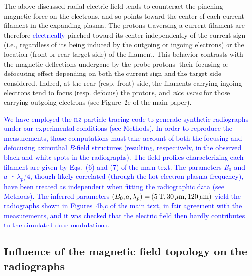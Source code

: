 \documentclass[aps,superscriptaddress]{revtex4}
\begin{document}
The above-discussed radial electric field tends to counteract the pinching magnetic force on the electrons, and so points toward the center of each current filament in the expanding plasma. The protons traversing a current filament are therefore \textcolor{blue}{electrically} pinched toward its center independently of the current sign (i.e., regardless of its being induced by the outgoing or ingoing electrons) or the location (front or rear target side) of the filament. This behavior contrasts with the magnetic deflections undergone by the probe protons, their focusing or defocusing effect depending on both the current sign and the target side considered. Indeed, at the rear (resp. front) side, the filaments carrying ingoing electrons tend to focus (resp. defocus) the protons, and \emph{vice versa} for those carrying outgoing electrons (see Figure~2e of the main paper).

\textcolor{blue}{We have employed the \textsc{ilz} particle-tracing code to generate synthetic radiographs under our experimental conditions (see Methods). In order to reproduce the measurements, those computations must take account of both the focusing and defocusing azimuthal $B$-field structures (resulting, respectively, in the observed black and white spots in the radiographs). The field profiles characterizing each filament are given by Eqs.~(6) and (7) of the main text. The parameters $B_0$ and $a \simeq \lambda_p/4$, though likely correlated (through the hot-electron plasma frequency), have been treated as independent when fitting the radiographic data (see Methods). The inferred parameters $(B_0,a,\lambda_p)=(5\,\rm T,30\,\rm \mu m,120\,\rm \mu m)$ yield the radiographs shown in Figures~4b,c of the main text, in fair agreement with the measurements, and it was checked that the electric field then hardly contributes to the simulated dose modulations.
}

\subsection{Influence of the magnetic field topology on the radiographs}
\end{document}
